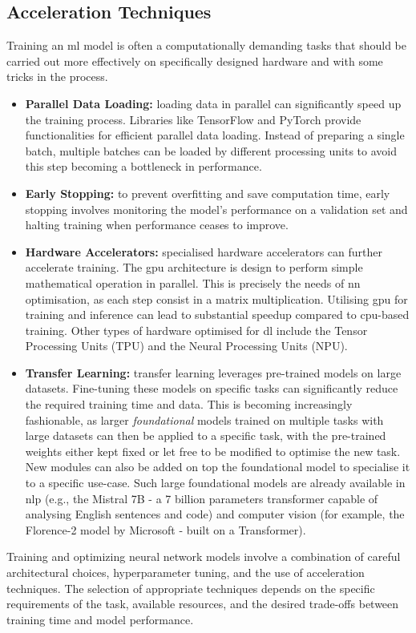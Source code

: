 \subsection{Acceleration Techniques}
Training an \gls{ml} model is often a computationally demanding tasks that should be carried out more effectively on specifically designed hardware and with some tricks in the process. 
\begin{itemize}
    \item \textbf{Parallel Data Loading:} loading data in parallel can significantly speed up the training process. Libraries like TensorFlow and PyTorch provide functionalities for efficient parallel data loading. Instead of preparing a single batch, multiple batches can be loaded by different processing units to avoid this step becoming a bottleneck in performance. 
    \item \textbf{Early Stopping:} to prevent overfitting and save computation time, early stopping involves monitoring the model's performance on a validation set and halting training when performance ceases to improve.
    \item  \textbf{Hardware Accelerators:} specialised hardware accelerators can further accelerate training. The \gls{gpu} architecture is design to perform simple mathematical operation in parallel. This is precisely the needs of \gls{nn} optimisation, as each step consist in a matrix multiplication. Utilising \gls{gpu} for training and inference can lead to substantial speedup compared to \gls{cpu}-based training. Other types of hardware optimised for \gls{dl} include the Tensor Processing Units (TPU) and the Neural Processing Units (NPU). 
    \item \textbf{Transfer Learning:} transfer learning leverages pre-trained models on large datasets. Fine-tuning these models on specific tasks can significantly reduce the required training time and data. This is becoming increasingly fashionable, as larger \textit{foundational} models trained on multiple tasks with large datasets can then be applied to a specific task, with the pre-trained weights either kept fixed or let free to be modified to optimise the new task. New modules can also be added on top the foundational model to specialise it to a specific use-case. Such large foundational models are already available in \gls{nlp} (e.g., the Mistral 7B \cite{jiang2023mistral} - a 7 billion parameters transformer capable of analysing English sentences and code) and computer vision (for example, the Florence-2 model by Microsoft \cite{xiao2023florence2} - built on a Transformer).
\end{itemize}
Training and optimizing neural network models involve a combination of careful architectural choices, hyperparameter tuning, and the use of acceleration techniques. The selection of appropriate techniques depends on the specific requirements of the task, available resources, and the desired trade-offs between training time and model performance.
